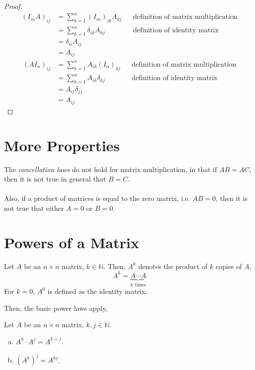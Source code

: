 \documentclass[letterpaper,12pt]{article}
\begin{document}
\begin{proof}
\begin{align*}
    (I_m A)_{ij} & = \sum_{k=1}^n (I_m)_{ik} A_{kj} && \text{definition of matrix multiplication} \\
    & = \sum_{k=1}^n \delta_{ik} A_{kj} && \text{definition of identity matrix} \\
    & = \delta_{ii} A_{ij} \\
    & = A_{ij}
\end{align*}
\begin{align*}
    (A I_n)_{ij} & = \sum_{k=1}^n A_{ik} (I_n)_{kj} && \text{definition of matrix multiplication} \\
    & = \sum_{k=1}^n A_{ik} \delta_{kj} && \text{definition of identity matrix} \\
    & = A_{ij} \delta_{jj} \\
    & = A_{ij}
\end{align*}
\end{proof}

\section*{More Properties}
The \textit{cancellation laws} do not hold for matrix multiplication, in that if $AB = AC$, then it is not true in general that $B = C$.
\\ \\ Also, if a product of matrices is equal to the zero matrix, i.e. $AB = 0$, then it is not true that either $A = 0$ or $B = 0$.

\section*{Powers of a Matrix}
\begin{definition}
Let $A$ be an $n \times n$ matrix, $k \in \mathbb{N}$. Then, $A^k$ denotes the product of $k$ copies of $A$,
\begin{equation*}
    A^k = \underbrace{A \cdots A}_{\text{$k$ times}}
\end{equation*}
For $k = 0$, $A^0$ is defined as the identity matrix.
\end{definition}

Then, the basic power laws apply,

\begin{theorem}
Let $A$ be an $n \times n$ matrix, $k,j \in \mathbb{N}$.
\begin{enumerate}[(a)]
    \item $A^k \cdot A^j = A^{k+j}$.
    \item $(A^k)^j = A^{kj}$.
\end{enumerate}
\end{theorem}
\end{document}
